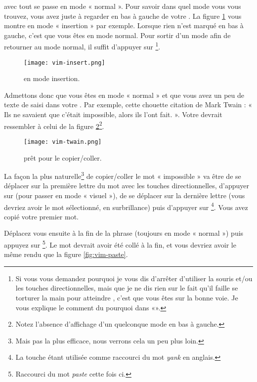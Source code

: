  avec \vim tout se passe en mode « normal ». Pour savoir dans quel mode vous vous trouvez, vous avez juste à regarder en bas à gauche de votre \vim. La figure \ref{fig:insert} vous montre \vim en mode « insertion » par exemple. Lorsque rien n'est marqué en bas à gauche, c'est que vous êtes en mode normal. Pour sortir d'un mode afin de retourner au mode normal, il suffit d'appuyer sur \ttesc\footnote{Si vous vous demandez pourquoi je vous dis d'arrêter d'utiliser la souris et/ou les touches directionnelles, mais que je ne dis rien sur le fait qu'il faille se torturer la main pour atteindre \ttesc, c'est que vous êtes sur la bonne voie. Je vous explique le comment du pourquoi dans «».}.

\begin{figure}%
  \texttt{[image: vim-insert.png]}
  \caption{\vim en mode insertion.}
  \label{fig:insert}
\end{figure}

Admettons donc que vous êtes en mode « normal » et que vous avez un peu de texte de saisi dans votre \vim. Par exemple, cette chouette citation de Mark Twain : « Ils ne savaient que c'était impossible, alors ils l'ont fait. ». Votre \vim devrait ressembler à celui de la figure \ref{fig:vim-twain}\footnote{Notez l'absence d'affichage d'un quelconque mode en bas à gauche.}.

\begin{figure}%
  \texttt{[image: vim-twain.png]}
  \caption{\vim prêt pour le copier/coller.}
  \label{fig:vim-twain}
\end{figure}

La façon la plus naturelle\footnote{Mais pas la plus efficace, nous verrons cela un peu plus loin.} de copier/coller le mot « impossible » va être de se déplacer sur la première lettre du mot avec les touches directionnelles, d'appuyer sur \ttv (pour passer en mode « visuel »), de se déplacer sur la dernière lettre (vous devriez avoir le mot sélectionné, en surbrillance) puis d'appuyer sur \tty\footnote{La touche \ty étant utilisée comme raccourci du mot \emph{yank} en anglais.}. Vous avez copié votre premier mot.

Déplacez vous ensuite à la fin de la phrase (toujours en mode « normal ») puis appuyez sur \ttp\footnote{Raccourci du mot \emph{paste} cette fois ci.}. Le mot devrait avoir été collé à la fin, et vous devriez avoir le même rendu que la figure \ref{fig:vim-paste}.

